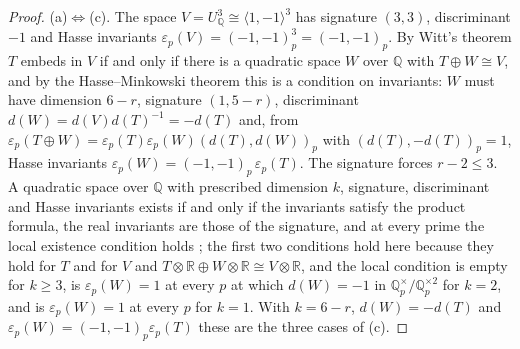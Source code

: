 \documentclass[11pt,reqno]{amsart}
\numberwithin{equation}{section}
\theoremstyle{plain}
\theoremstyle{definition}
\newcommand{\QQ}{\mathbb{Q}}
\newcommand{\RR}{\mathbb{R}}
\begin{document}
\begin{proof}
(a)$\Leftrightarrow$(c). The space $V=U_{\QQ}^{3}\cong\langle1,-1\rangle^{3}$ has signature $(3,3)$, discriminant $-1$ and Hasse invariants $\varepsilon_{p}(V)=(-1,-1)_{p}^{3}=(-1,-1)_{p}$. By Witt's theorem $T$ embeds in $V$ if and only if there is a quadratic space $W$ over $\QQ$ with $T\oplus W\cong V$, and by the Hasse--Minkowski theorem \cite[Ch.~IV, Thm.~9]{Ser73} this is a condition on invariants: $W$ must have dimension $6-r$, signature $(1,5-r)$, discriminant $d(W)=d(V)d(T)^{-1}=-d(T)$ and, from $\varepsilon_{p}(T\oplus W)=\varepsilon_{p}(T)\varepsilon_{p}(W)(d(T),d(W))_{p}$ with $(d(T),-d(T))_{p}=1$, Hasse invariants $\varepsilon_{p}(W)=(-1,-1)_{p}\,\varepsilon_{p}(T)$. The signature forces $r-2\le3$. A quadratic space over $\QQ$ with prescribed dimension $k$, signature, discriminant and Hasse invariants exists if and only if the invariants satisfy the product formula, the real invariants are those of the signature, and at every prime the local existence condition holds \cite[Ch.~IV, \S2.3, Prop.~6, and \S3.3, Prop.~7]{Ser73}; the first two conditions hold here because they hold for $T$ and for $V$ and $T\otimes\RR\oplus W\otimes\RR\cong V\otimes\RR$, and the local condition is empty for $k\ge3$, is $\varepsilon_{p}(W)=1$ at every $p$ at which $d(W)=-1$ in $\QQ_{p}^{\times}/\QQ_{p}^{\times2}$ for $k=2$, and is $\varepsilon_{p}(W)=1$ at every $p$ for $k=1$. With $k=6-r$, $d(W)=-d(T)$ and $\varepsilon_{p}(W)=(-1,-1)_{p}\varepsilon_{p}(T)$ these are the three cases of (c).


\end{proof}
\end{document}
